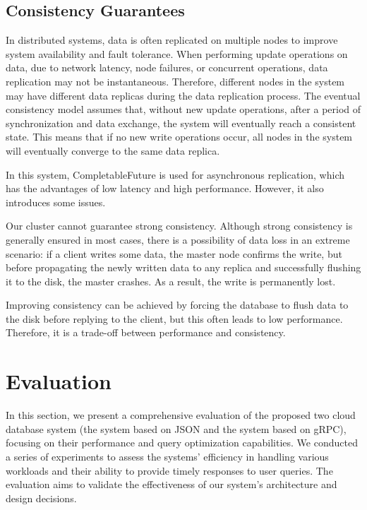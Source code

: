 \documentclass[sigconf]{acmart}
\begin{document}
\subsection{Consistency Guarantees}

In distributed systems, data is often replicated on multiple nodes to improve system availability and fault tolerance. When performing update operations on data, due to network latency, node failures, or concurrent operations, data replication may not be instantaneous. Therefore, different nodes in the system may have different data replicas during the data replication process. The eventual consistency model assumes that, without new update operations, after a period of synchronization and data exchange, the system will eventually reach a consistent state. This means that if no new write operations occur, all nodes in the system will eventually converge to the same data replica.

In this system, CompletableFuture is used for asynchronous replication, which has the advantages of low latency and high performance. However, it also introduces some issues.

Our cluster cannot guarantee strong consistency. Although strong consistency is generally ensured in most cases, there is a possibility of data loss in an extreme scenario: if a client writes some data, the master node confirms the write, but before propagating the newly written data to any replica and successfully flushing it to the disk, the master crashes. As a result, the write is permanently lost.

Improving consistency can be achieved by forcing the database to flush data to the disk before replying to the client, but this often leads to low performance. Therefore, it is a trade-off between performance and consistency.



\section{Evaluation}
In this section, we present a comprehensive evaluation of the proposed two cloud database system (the system based on JSON and the system based on gRPC), focusing on their performance and query optimization capabilities. We conducted a series of experiments to assess the systems' efficiency in handling various workloads and their ability to provide timely responses to user queries. The evaluation aims to validate the effectiveness of our system's architecture and design decisions.
\end{document}
